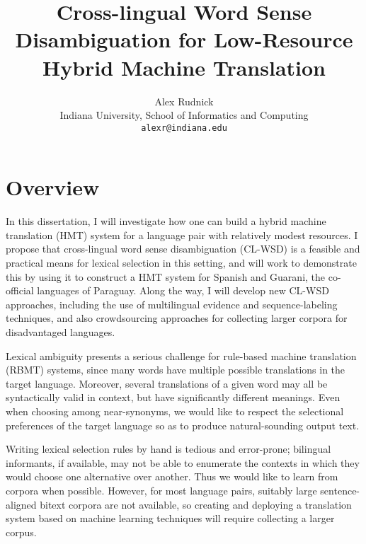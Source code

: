 \documentclass{article}
\title{Cross-lingual Word Sense Disambiguation for Low-Resource Hybrid Machine
Translation}
\author{Alex Rudnick \\
	    Indiana University, School of Informatics and Computing \\
	    {\tt alexr@indiana.edu}}
\date{}
\begin{document}
\maketitle

\section{Overview}


In this dissertation, I will investigate how one can build a hybrid machine
translation (HMT) system for a language pair with relatively modest resources.
I propose that cross-lingual word sense disambiguation (CL-WSD) is a
feasible and practical means for lexical selection in this setting, and will work to
demonstrate this by using it to construct a HMT system for
Spanish and Guarani, the co-official languages of Paraguay.
Along the way, I will develop new CL-WSD approaches, including the use of
multilingual evidence and sequence-labeling techniques, and also crowdsourcing
approaches for collecting larger corpora for disadvantaged languages.

Lexical ambiguity presents a serious challenge for rule-based machine
translation (RBMT) systems, since many words have multiple possible
translations in the target language. Moreover, several translations of a given
word may all be syntactically valid in context, but have significantly
different meanings. Even when choosing among near-synonyms, we would like to
respect the selectional preferences of the target language so as to produce
natural-sounding output text.

Writing lexical selection rules by hand is tedious and error-prone; bilingual
informants, if available, may not be able to enumerate the contexts in which
they would choose one alternative over another. Thus we would like to learn
from corpora when possible. However, for most language pairs, suitably large
sentence-aligned bitext corpora are not available, so creating and deploying a
translation system based on machine learning techniques will require collecting
a larger corpus.
\end{document}
